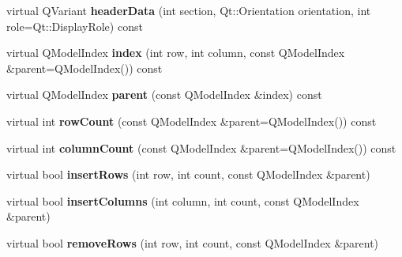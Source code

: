 \begin{DoxyCompactItemize}
\item 
virtual Q\+Variant {\bfseries header\+Data} (int section, Qt\+::\+Orientation orientation, int role=Qt\+::\+Display\+Role) const \hypertarget{class_extendable_item_model_a663343775e61999ae5244b52eeb011da}{}\label{class_extendable_item_model_a663343775e61999ae5244b52eeb011da}

\item 
virtual Q\+Model\+Index {\bfseries index} (int row, int column, const Q\+Model\+Index \&parent=Q\+Model\+Index()) const \hypertarget{class_extendable_item_model_a5a0a910835bc709db90f7438a481379a}{}\label{class_extendable_item_model_a5a0a910835bc709db90f7438a481379a}

\item 
virtual Q\+Model\+Index {\bfseries parent} (const Q\+Model\+Index \&index) const \hypertarget{class_extendable_item_model_a5dd0dfdea4d6fb193456d6ba27a51dd0}{}\label{class_extendable_item_model_a5dd0dfdea4d6fb193456d6ba27a51dd0}

\item 
virtual int {\bfseries row\+Count} (const Q\+Model\+Index \&parent=Q\+Model\+Index()) const \hypertarget{class_extendable_item_model_af3228a4c11e5b849e482c906ec2e1e8f}{}\label{class_extendable_item_model_af3228a4c11e5b849e482c906ec2e1e8f}

\item 
virtual int {\bfseries column\+Count} (const Q\+Model\+Index \&parent=Q\+Model\+Index()) const \hypertarget{class_extendable_item_model_a544d94fdce7ea5a08095ffef3b3271d8}{}\label{class_extendable_item_model_a544d94fdce7ea5a08095ffef3b3271d8}

\item 
virtual bool {\bfseries insert\+Rows} (int row, int count, const Q\+Model\+Index \&parent)\hypertarget{class_extendable_item_model_a1ce2fcafb7dea41b0d922b7172d23e0d}{}\label{class_extendable_item_model_a1ce2fcafb7dea41b0d922b7172d23e0d}

\item 
virtual bool {\bfseries insert\+Columns} (int column, int count, const Q\+Model\+Index \&parent)\hypertarget{class_extendable_item_model_abd1e1a5e8d942216dd9cfeaab5564eda}{}\label{class_extendable_item_model_abd1e1a5e8d942216dd9cfeaab5564eda}

\item 
virtual bool {\bfseries remove\+Rows} (int row, int count, const Q\+Model\+Index \&parent)\hypertarget{class_extendable_item_model_a0845398488e6f714ca6eda0670a7aa8e}{}\label{class_extendable_item_model_a0845398488e6f714ca6eda0670a7aa8e}


\end{DoxyCompactItemize}
